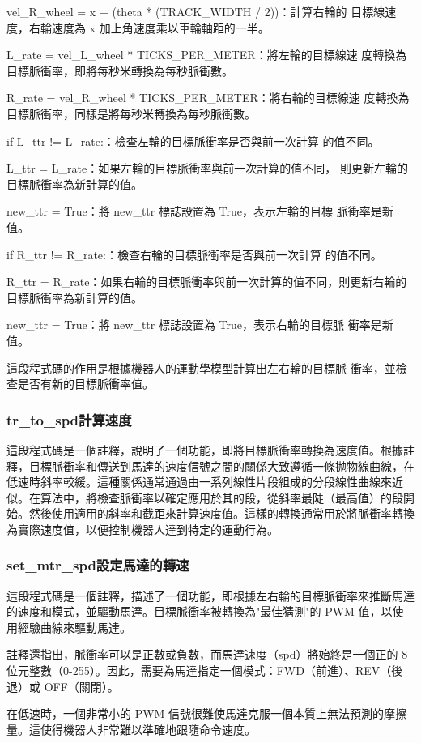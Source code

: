 vel\_R\_wheel = x + (theta * (TRACK\_WIDTH / 2))：計算右輪的
目標線速度，右輪速度為 x 加上角速度乘以車輪軸距的一半。

L\_rate = vel\_L\_wheel * TICKS\_PER\_METER：將左輪的目標線速
度轉換為目標脈衝率，即將每秒米轉換為每秒脈衝數。

R\_rate = vel\_R\_wheel * TICKS\_PER\_METER：將右輪的目標線速
度轉換為目標脈衝率，同樣是將每秒米轉換為每秒脈衝數。

if L\_ttr != L\_rate:：檢查左輪的目標脈衝率是否與前一次計算
的值不同。

L\_ttr = L\_rate：如果左輪的目標脈衝率與前一次計算的值不同，
則更新左輪的目標脈衝率為新計算的值。

new\_ttr = True：將 new\_ttr 標誌設置為 True，表示左輪的目標
脈衝率是新值。

if R\_ttr != R\_rate:：檢查右輪的目標脈衝率是否與前一次計算
的值不同。

R\_ttr = R\_rate：如果右輪的目標脈衝率與前一次計算的值不同，則更新右輪的目標脈衝率為新計算的值。

new\_ttr = True：將 new\_ttr 標誌設置為 True，表示右輪的目標脈
衝率是新值。

這段程式碼的作用是根據機器人的運動學模型計算出左右輪的目標脈
衝率，並檢查是否有新的目標脈衝率值。

\subsubsection{tr\_to\_spd計算速度}
這段程式碼是一個註釋，說明了一個功能，即將目標脈衝率轉換為速度值。根據註釋，目標脈衝率和傳送到馬達的速度信號之間的關係大致遵循一條抛物線曲線，在低速時斜率較緩。這種關係通常通過由一系列線性片段組成的分段線性曲線來近似。在算法中，將檢查脈衝率以確定應用於其的段，從斜率最陡（最高值）的段開始。然後使用適用的斜率和截距來計算速度值。這樣的轉換通常用於將脈衝率轉換為實際速度值，以便控制機器人達到特定的運動行為。

\subsubsection{set\_mtr\_spd設定馬達的轉速}
這段程式碼是一個註釋，描述了一個功能，即根據左右輪的目標脈衝率來推斷馬達的速度和模式，並驅動馬達。目標脈衝率被轉換為"最佳猜測"的 PWM 值，以使用經驗曲線來驅動馬達。

註釋還指出，脈衝率可以是正數或負數，而馬達速度（spd）將始終是一個正的 8 位元整數（0-255）。因此，需要為馬達指定一個模式：FWD（前進）、REV（後退）或 OFF（關閉）。

在低速時，一個非常小的 PWM 信號很難使馬達克服一個本質上無法預測的摩擦量。這使得機器人非常難以準確地跟隨命令速度。

